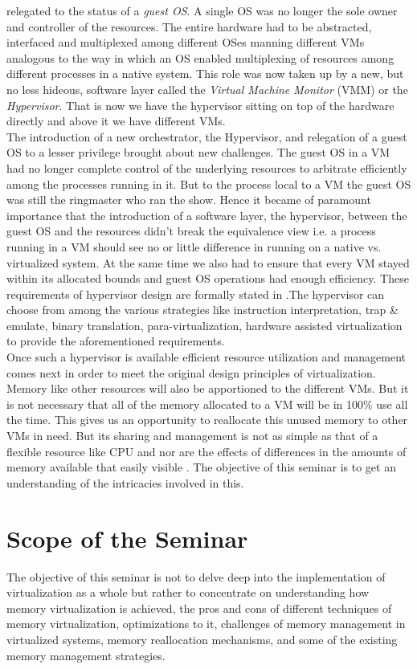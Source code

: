 relegated to the status of a \textit{guest OS}. A single OS was no longer the sole owner and
controller of the resources. The entire hardware had to be abstracted, interfaced and multiplexed
among different OSes manning different VMs analogous to the way in which an OS enabled
multiplexing of resources among different processes in a native system. This role was now taken up
by a new, but no less hideous, software layer called the \textit{Virtual Machine Monitor} (VMM) or
the \textit{Hypervisor}. That is now we have the hypervisor sitting on top of the hardware 
directly and above it we have different VMs.\\
The introduction of a new orchestrator, the Hypervisor, and relegation of a guest OS to a lesser
privilege brought about new challenges. The guest OS in a VM had no longer complete control of the
underlying resources to arbitrate efficiently among the processes running in it. But to the
process local to a VM the guest OS was still the ringmaster who ran the show. Hence it became of
paramount importance that the introduction of a software layer, the hypervisor, between the guest
OS and the resources didn't break the equivalence view  i.e. a process running in a VM should see
no or little difference in running on a native vs. virtualized system. At the same time we also
had to ensure that every VM stayed within its allocated bounds and guest OS operations had enough
efficiency. These requirements of hypervisor design are formally stated in 
\cite{popek1974formal}.The hypervisor can choose from among the various strategies like
instruction interpretation, trap \& emulate, binary translation, para-virtualization, hardware
assisted virtualization to provide the aforementioned requirements.\\
Once such a hypervisor is available efficient resource utilization and management comes next in
order to meet the original design principles of virtualization. Memory like other
resources will also be apportioned to the different VMs. But it is not necessary that all  of the
memory allocated to a VM will be in 100\% use all the time. This gives us an opportunity to
reallocate this unused memory to other VMs in need. But its sharing and management is not as
simple as that of a flexible resource like CPU and nor are the effects of differences in the
amounts of memory available that easily visible \citep{hwang2013mortar}. The objective of this
seminar is to get an understanding of the intricacies involved in this. 

\section{Scope of the Seminar}
The objective of this seminar is not to delve deep into the implementation of virtualization as a
whole but rather to concentrate on understanding how memory virtualization is achieved, the pros and cons of different techniques of memory virtualization, optimizations to it, challenges of memory management in virtualized systems, memory reallocation mechanisms, and some of the existing memory management strategies.     

